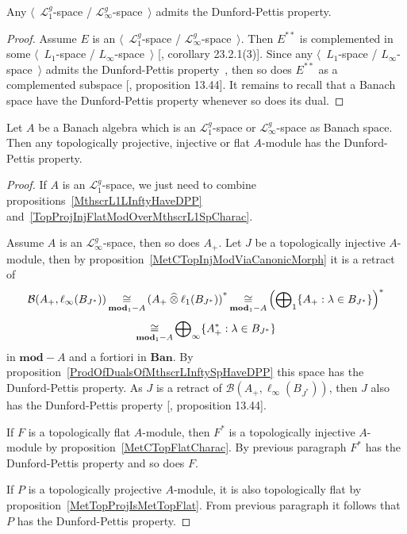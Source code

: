 \begin{proposition}\label{MthscrL1LInftyHaveDPP} Any
$\langle$~$\mathscr{L}_1^g$-space / $\mathscr{L}_\infty^g$-space~$\rangle$
admits the Dunford-Pettis property.
\end{proposition}
\begin{proof} Assume $E$ is an $\langle$~$\mathscr{L}_1^g$-space /
$\mathscr{L}_\infty^g$-space~$\rangle$. Then $E^{**}$ is complemented in some
$\langle$~$L_1$-space / $L_\infty$-space~$\rangle$ [\cite{DefFloTensNorOpId},
corollary 23.2.1(3)]. Since any $\langle$~$L_1$-space /
$L_\infty$-space~$\rangle$ admits the Dunford-Pettis
property~\cite{GrothApllFaiblCompSpCK}, then so does $E^{**}$ as a complemented
subspace [\cite{FabHabBanSpTh}, proposition 13.44]. It remains to recall that a
Banach space have the Dunford-Pettis property whenever so does its dual.
\end{proof}

\begin{theorem}\label{TopProjInjFlatModOverMthscrL1OrLInftySpHaveDPP} Let $A$ be
a Banach algebra which is an $\mathscr{L}_1^g$-space or
$\mathscr{L}_\infty^g$-space as Banach space. Then any topologically projective,
injective or flat $A$-module has the Dunford-Pettis property.
\end{theorem}
\begin{proof} If $A$ is an $\mathscr{L}_1^g$-space, we just need to combine
propositions~\ref{MthscrL1LInftyHaveDPP}
and~\ref{TopProjInjFlatModOverMthscrL1SpCharac}. 

Assume $A$ is an $\mathscr{L}_\infty^g$-space, then so does $A_+$. Let $J$ be a
topologically injective $A$-module, then by
proposition~\ref{MetCTopInjModViaCanonicMorph} it is a retract of 
$$
\mathcal{B}(A_+,\ell_\infty(B_{J^*}))
\mathop{\mathbin{\cong}}\limits_{\mathbf{mod}_1-A}
{(A_+\mathbin{\widehat{\otimes}}\ell_1(B_{J^*}))}^*
\mathop{\mathbin{\cong}}\limits_{\mathbf{mod}_1-A}
{\left(\bigoplus\nolimits_1 \{ A_+:\lambda\in B_{J^*} \}\right)}^*
$$
$$
\mathop{\mathbin{\cong}}\limits_{\mathbf{mod}_1-A}
\bigoplus\nolimits_\infty \{ A_+^*:\lambda\in B_{J^*} \}
$$ 
in $\mathbf{mod}-A$ and a fortiori in $\mathbf{Ban}$. By
proposition~\ref{ProdOfDualsOfMthscrLInftySpHaveDPP} this space has the
Dunford-Pettis property. As $J$ is a retract 
of $\mathcal{B}(A_+,\ell_\infty(B_{J^*}))$, then $J$ also has 
the Dunford-Pettis property [\cite{FabHabBanSpTh}, proposition 13.44]. 

If $F$ is a topologically flat $A$-module, then $F^*$ is a topologically
injective $A$-module by proposition~\ref{MetCTopFlatCharac}. By previous
paragraph $F^*$ has the Dunford-Pettis property and so does $F$.

If $P$ is a topologically projective $A$-module, it is also topologically flat
by proposition~\ref{MetTopProjIsMetTopFlat}. From previous paragraph it follows
that $P$ has the Dunford-Pettis property.
\end{proof}

